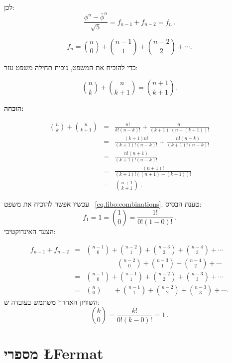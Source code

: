 לכן:
\[
\frac{\phi^n - \bar{\phi}^n}{\sqrt{5}} = f_{n-1} + f_{n-2} = f_n\,.
\]
\begin{theorem}\label{eq.fibo:combinations}
\[
f_n = {n \choose 0} + {n-1 \choose 1} + {n-2 \choose 2} + \cdots.
\]
\end{theorem}



כדי להוכיח את המשפט, נוכיח תחילה משפט עזר:
\begin{theorem}[\L{Pascal}]
\[
{n \choose k} + {n \choose k+1} = {n+1 \choose k+1}.
\]
\end{theorem}

\textbf{הוכחה:}

\begin{eqnarray*}
{n \choose k} + {n \choose k+1} &=& \frac{n!}{k!(n-k)!} + \frac{n!}{(k+1)!(n-(k+1))!}\\
&=& \frac{(k+1)n!}{(k+1)!(n-k)!} + \frac{n! (n-k)}{(k+1)!(n-k)!}\\
&=&\frac{n!(n+1)}{(k+1)!(n-k)!}\\
&=&\frac{(n+1)!}{(k+1)!((n+1)-(k+1))!}\\
&=&{n+1 \choose k+1}\,.
\end{eqnarray*}

עכשיו אפשר להוכיח את משפט~%
\ref{eq.fibo:combinations}.
טענת הבסיס:
\[
f_1 = 1 = {1 \choose 0} = \frac{1!}{0!(1-0)!}\,.
\]
הצעד האינדוקטיבי:

\begin{eqnarray*}
f_{n-1} + f_{n-2} &=& {n-1 \choose 0} + {n-2 \choose 1} + {n-3 \choose 2} + {n-4 \choose 3} + \cdots\\
&&\hspace{54pt}{n-2 \choose 0} + {n-3 \choose 1} + {n-4 \choose 2} + \cdots\\
&=&{n-1 \choose 0} + {n-1 \choose 1} + {n-2 \choose 2} + {n-3 \choose 3} + \cdots\\
&=&{n \choose 0}\hspace{20pt} + {n-1 \choose 1} + {n-2 \choose 2} + {n-3 \choose 3} + \cdots.
\end{eqnarray*}
השוויון האחרון משתמש בעובדה ש:
\[
{k \choose 0} = \frac{k!}{0!(k-0)!} = 1\,.
\]




\section{מספרי \L{Fermat}}


